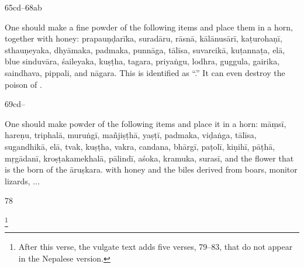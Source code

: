 \begin{translation}
\item [65cd--68ab]

One should make a fine powder of the following items and place them in a 
horn, together with honey: %
\gls{prapauṇḍarīka},
\gls{suradāru},
\gls{rāsnā},
\gls{kālānusārī},
\gls{kaṭurohaṇī},
\gls{sthauṇeyaka}, 
\gls{dhyāmaka},
\gls{padmaka}, 
\gls{punnāga},
\gls{tālīsa}, 
\gls{suvarcikā},
\gls{kuṭannaṭa}, 
\gls{elā},
blue \gls{sinduvāra}, 
\gls{śaileyaka},
\gls{kuṣṭha},
\gls{tagara},
\gls{priyaṅgu},
\gls{lodhra},
\gls{guggula}, 
\gls{gairika}, 
\gls{saindhava}, %
\gls{pippali}, 
and 
\gls{nāgara}.  This  is identified as 
“.” It can even destroy the poison of  .

\item [69cd--] 

One should make powder of the following items and place it in a 
horn:
\gls{māṃsī},
\gls{hareṇu},
\gls{triphalā},
\gls{muruṅgī},
\gls{mañjiṣṭhā},
\gls{yaṣṭī},
\gls{padmaka},
\gls{viḍaṅga},
\gls{tālīsa},
\gls{sugandhikā},
\gls{elā},
\gls{tvak},
\gls{kuṣṭha},
\gls{vakra}, 
\gls{candana}, 
\gls{bhārgī}, 
\gls{paṭolī},
\gls{kiṇihī}, 
\gls{pāṭhā},
\gls{mṛgādanī},
\gls{kroṣṭakamekhalā}, 
\gls{pālindī}, 
\gls{aśoka}, 
\gls{kramuka}, 
\gls{surasī},
and the flower that is the  born of the \gls{āruṣkara}. 
with honey and the biles derived from  boars, monitor lizards, ... 



    
    \strut
    \bigskip
    
       
     \item[78] 
     
     \footnote{After this verse, the vulgate text adds five
        verses, 79--83, that do not appear in the Nepalese version.}
\end{translation}    